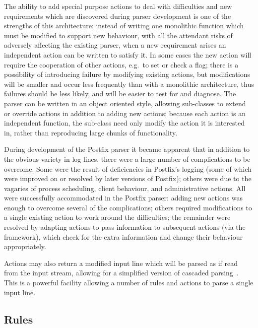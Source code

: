 \documentclass[draft]{svmult}
\begin{document}
The ability to add special purpose actions to deal with difficulties and
new requirements which are discovered during parser development is one of
the strengths of this architecture: instead of writing one monolithic
function which must be modified to support new behaviour, with all the
attendant risks of adversely affecting the existing parser, when a new
requirement arises an independent action can be written to satisfy it.  In
some cases the new action will require the cooperation of other actions,
e.g.\ to set or check a flag; there is a possibility of introducing failure
by modifying existing actions, but modifications will be smaller and occur
less frequently than with a monolithic architecture, thus failures should
be less likely, and will be easier to test for and diagnose.  The parser
can be written in an object oriented style, allowing sub-classes to extend
or override actions in addition to adding new actions; because each action
is an independent function, the sub-class need only modify the action it is
interested in, rather than reproducing large chunks of functionality.

\label{complications}

During development of the Postfix parser it became apparent that in
addition to the obvious variety in log lines, there were a large number of
complications to be overcome.  Some were the result of deficiencies in
Postfix's logging (some of which were improved on or resolved by later
versions of Postfix); others were due to the vagaries of process
scheduling, client behaviour, and administrative actions.  All were
successfully accommodated in the Postfix parser: adding new actions was
enough to overcome several of the complications; others required
modifications to a single existing action to work around the difficulties;
the remainder were resolved by adapting actions to pass information to
subsequent actions (via the framework), which check for the extra
information and change their behaviour appropriately.

Actions may also return a modified input line which will be parsed as if
read from the input stream, allowing for a simplified version of cascaded
parsing~\cite{cascaded-parsing}.  This is a powerful facility allowing a
number of rules and actions to parse a single input line.

\subsection{Rules}
\end{document}
